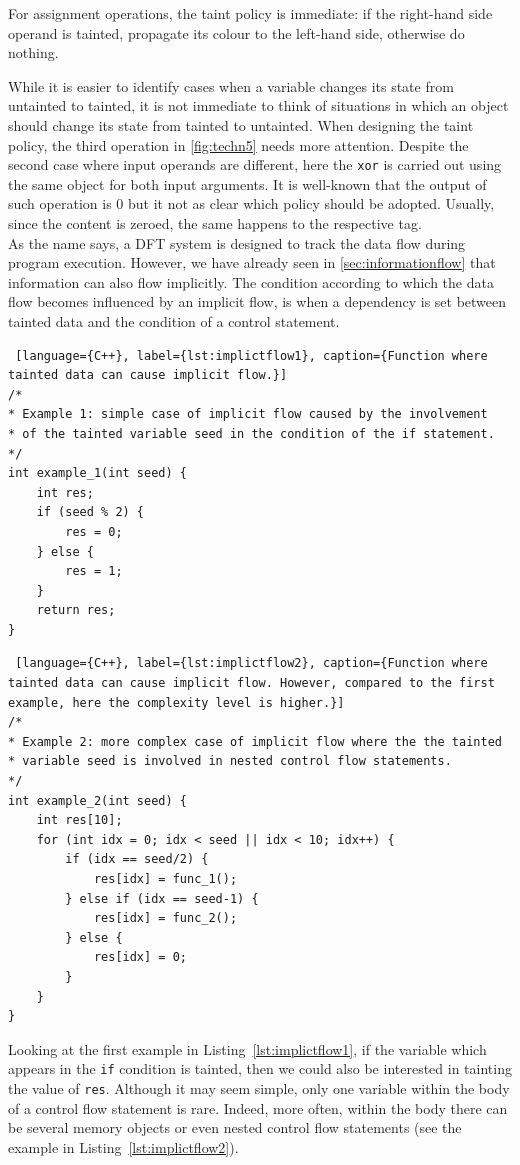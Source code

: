 \documentclass[LaM,binding=0.6cm]{sapthesis}
\begin{document}
For assignment operations, the taint policy is immediate: if the right-hand side operand is tainted, propagate its colour to the left-hand side, otherwise do nothing.

While it is easier to identify cases when a variable changes its state from untainted to tainted, it is not immediate to think of situations in which an object should change its state from tainted to untainted. When designing the taint policy, the third operation in \autoref{fig:techn5} needs more attention. Despite the second case where input operands are different, here the \texttt{xor} is carried out using the same object for both input arguments. It is well-known that the output of such operation is $0$ but it not as clear which policy should be adopted. Usually, since the content is zeroed, the same happens to the respective tag.\\

\noindent
As the name says, a DFT system is designed to track the data flow during program execution. However, we have already seen in \autoref{sec:informationflow} that information can also flow implicitly. The condition according to which the data flow becomes influenced by an implicit flow, is when a dependency is set between tainted data and the condition of a control statement.

\begin{lstlisting} [language={C++}, label={lst:implictflow1}, caption={Function where tainted data can cause implicit flow.}]
/*
* Example 1: simple case of implicit flow caused by the involvement
* of the tainted variable seed in the condition of the if statement.
*/
int example_1(int seed) {
	int res;
	if (seed % 2) {
		res = 0;
	} else {
		res = 1;
	}
	return res;
}
\end{lstlisting}
\clearpage
\begin{lstlisting} [language={C++}, label={lst:implictflow2}, caption={Function where tainted data can cause implicit flow. However, compared to the first example, here the complexity level is higher.}]
/*
* Example 2: more complex case of implicit flow where the the tainted
* variable seed is involved in nested control flow statements.
*/
int example_2(int seed) {
	int res[10];
	for (int idx = 0; idx < seed || idx < 10; idx++) {
		if (idx == seed/2) {
			res[idx] = func_1();
		} else if (idx == seed-1) {
			res[idx] = func_2();
		} else {
			res[idx] = 0;
		}	
	}
}
\end{lstlisting}

\noindent
Looking at the first example in Listing~\ref{lst:implictflow1}, if the variable which appears in the \texttt{if} condition is tainted, then we could also be interested in tainting the value of \texttt{res}. Although it may seem simple, only one variable within the body of a control flow statement is rare. Indeed, more often, within the body there can be several memory objects or even nested control flow statements (see the example in Listing~\ref{lst:implictflow2}).
\end{document}
